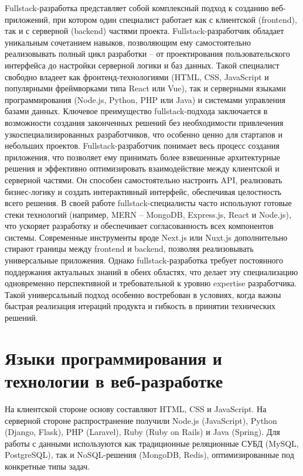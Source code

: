 \documentclass[referat]{SCWorks}
\begin{document}
Fullstack-разработка представляет собой комплексный подход к созданию веб-приложений, при котором один специалист работает как с клиентской (frontend), так и с серверной (backend) частями проекта. Fullstack-разработчик обладает уникальным сочетанием навыков, позволяющим ему самостоятельно реализовывать полный цикл разработки -- от проектирования пользовательского интерфейса до настройки серверной логики и баз данных. Такой специалист свободно владеет как фронтенд-технологиями (HTML, CSS, JavaScript и популярными фреймворками типа React или Vue), так и серверными языками программирования (Node.js, Python, PHP или Java) и системами управления базами данных. Ключевое преимущество fullstack-подхода заключается в возможности создания законченных решений без необходимости привлечения узкоспециализированных разработчиков, что особенно ценно для стартапов и небольших проектов. Fullstack-разработчик понимает весь процесс создания приложения, что позволяет ему принимать более взвешенные архитектурные решения и эффективно оптимизировать взаимодействие между клиентской и серверной частями. Он способен самостоятельно настроить API, реализовать бизнес-логику и создать интерактивный интерфейс, обеспечивая целостность всего решения. В своей работе fullstack-специалисты часто используют готовые стеки технологий (например, MERN -- MongoDB, Express.js, React и Node.js), что ускоряет разработку и обеспечивает согласованность всех компонентов системы. Современные инструменты вроде Next.js или Nuxt.js дополнительно стирают границы между frontend и backend, позволяя реализовывать универсальные приложения. Однако fullstack-разработка требует постоянного поддержания актуальных знаний в обеих областях, что делает эту специализацию одновременно перспективной и требовательной к уровню expertise разработчика. Такой универсальный подход особенно востребован в условиях, когда важны быстрая реализация итераций продукта и гибкость в принятии технических решений.\cite{fullstack_guide}

\section{Языки программирования и технологии в веб-разработке}

На клиентской стороне основу составляют HTML, CSS и JavaScript. На серверной стороне распространение получили Node.js (JavaScript), Python (Django, Flask), PHP (Laravel), Ruby (Ruby on Rails) и Java (Spring). Для работы с данными используются как традиционные реляционные СУБД (MySQL, PostgreSQL), так и NoSQL-решения (MongoDB, Redis), оптимизированные под конкретные типы задач.
\end{document}
